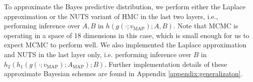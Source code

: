 \documentclass[11pt]{article}
\DeclareMathOperator*{\E}{\operatorname{\mathbb{E}}}
\numberwithin{equation}{section}
\theoremstyle{plain}
\theoremstyle{definition}
\begin{document}
\begin{table}[h!]%
	\caption{Companion to Figure \ref{fig:avg_gen_err_fullbatch_realisable}. The learning coefficient is the slope of the linear fit $1/n$ versus $\E_n G(n)$ (no intercept since realisable). The $R^2$ value gives a sense of the goodness-of-fit.}
	\label{table:avg_gen_err_fullbatch_realisable}
	\begin{tiny}
		\begin{subtable}[t]{.5\linewidth}
			\caption{1 hidden layer(s) in $g$, identity activation in $h$}			
		\end{subtable}
	\hspace{2em}
		\begin{subtable}[t]{.5\linewidth}
			\caption{5 hidden layer(s) in $g$, identity activation in $h$}
			
		\end{subtable}
		\begin{subtable}[t]{.5\linewidth}
			\caption{1 hidden layer(s) in $g$, ReLU activation in $h$}
			
		\end{subtable}
	\hspace{2em}
		\begin{subtable}[t]{.5\linewidth}
			\caption{5 hidden layer(s) in $g$, ReLU activation in $h$}			
		\end{subtable}
	\end{tiny}
\end{table}

To approximate the Bayes predictive distribution, we perform either the Laplace approximation or the NUTS variant of HMC \citep{hoffman2014no} in the last two layers, i.e., performing inference over $A,B$ in
$h(g(\cdot;v_{\operatorname{MAP}});A,B).$
Note that MCMC is operating in a space of 18 dimensions in this case, which is small enough for us to expect MCMC to perform well.
We also implemented the Laplace approximation and NUTS in the last layer only, i.e. performing inference over $B$ in
$h_2(h_1(g(\cdot;v_{\operatorname{MAP}});A_{\operatorname{MAP}}); B).$
Further implementation details of these approximate Bayesian schemes are found in Appendix \ref{appendix:generalizaton}.
\end{document}
